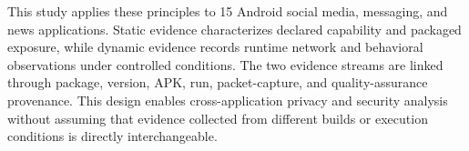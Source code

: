 This study applies these principles to 15 Android social media, messaging, and news applications. Static evidence characterizes declared capability and packaged exposure, while dynamic evidence records runtime network and behavioral observations under controlled conditions. The two evidence streams are linked through package, version, APK, run, packet-capture, and quality-assurance provenance. This design enables cross-application privacy and security analysis without assuming that evidence collected from different builds or execution conditions is directly interchangeable.

